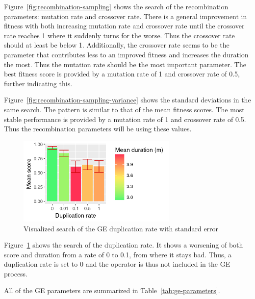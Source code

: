 Figure~\ref{fig:recombination-sampling} shows the search of the recombination parameters: mutation rate and crossover rate.
There is a general improvement in fitness with both increasing mutation rate and crossover rate until the crossover rate reaches 1 where it suddenly turns for the worse.
Thus the crossover rate should at least be below 1.
Additionally, the crossover rate seems to be the parameter that contributes less to an improved fitness and increases the duration the most.
Thus the mutation rate should be the most important parameter.
The best fitness score is provided by a mutation rate of 1 and crossover rate of 0.5, further indicating this.

Figure~\ref{fig:recombination-sampling-variance} shows the standard deviations in the same search.
The pattern is similar to that of the mean fitness scores.
The most stable performance is provided by a mutation rate of 1 and crossover rate of 0.5.
Thus the recombination parameters will be using these values.

\begin{figure}
    \centering
    \includegraphics[width=0.7\textwidth]{figures/ge-duplication-sampling}
    \caption[Visualized search of the GE duplication rate]{Visualized search of the GE duplication rate with standard error}
    \label{fig:duplication-sampling}
\end{figure}

Figure~\ref{fig:duplication-sampling} shows the search of the duplication rate.
It shows a worsening of both score and duration from a rate of 0 to 0.1, from where it stays bad.
Thus, a duplication rate is set to 0 and the operator is thus not included in the GE process.

All of the GE parameters are summarized in Table~\ref{tab:ge-parameters}.

